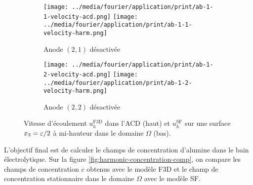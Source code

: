 \begin{figure}[h]
  \begin{center}
    \begin{subfigure}[t]{\textwidth}
      \begin{center}
        \texttt{[image: ../media/fourier/application/print/ab-1-1-velocity-acd.png]}
        \texttt{[image: ../media/fourier/application/print/ab-1-1-velocity-harm.png]}
        \caption{Anode $(2,1)$ désactivée}
        \label{fig:}
      \end{center}
    \end{subfigure}

    \begin{subfigure}[t]{\textwidth}
      \begin{center}
        \texttt{[image: ../media/fourier/application/print/ab-1-2-velocity-acd.png]}
        \texttt{[image: ../media/fourier/application/print/ab-1-2-velocity-harm.png]}
        \caption{Anode $(2,2)$ désactivée}
        \label{fig:}
      \end{center}
    \end{subfigure}


    \caption{Vitesse d'écoulement $u_h^\mathrm{F3D}$ dans l'ACD (haut) et $u_h^\mathrm{SF}$ sur une surface
      $x_3 = \varepsilon / 2$ à mi-hauteur dans le domaine $\Omega$ (bas).}
    \label{fig:harmonic-velocity-comp}
  \end{center}
\end{figure}

L'objectif final est de calculer le champs de concentration d'alumine
dans le bain électrolytique. Sur la figure
\ref{fig:harmonic-concentration-comp}, on compare les champs de
concentration $c$ obtenus avec le modèle F3D et le champ de
concentration stationnaire dans le domaine $\Omega$ avec le modèle
SF.

